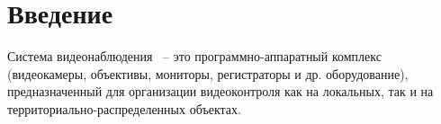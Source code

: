 \section{Введение}

Система видеонаблюдения ~-- это программно-аппаратный комплекс
(видеокамеры, объективы, мониторы, регистраторы и др. оборудование),
предназначенный для организации видеоконтроля как на локальных, так и на
территориально-распределенных объектах.
